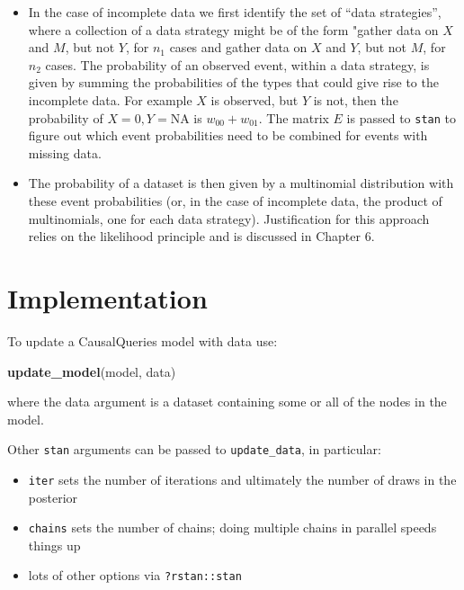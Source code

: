 \documentclass[
  12pt,
]{book}
\newenvironment{Shaded}{\begin{snugshade}}{\end{snugshade}}
\newcommand{\KeywordTok}[1]{\textcolor[rgb]{0.13,0.29,0.53}{\textbf{#1}}}
\newcommand{\NormalTok}[1]{#1}
\providecommand{\tightlist}{%
  \setlength{\itemsep}{0pt}\setlength{\parskip}{0pt}}
\begin{document}
\begin{itemize}
\item
  In the case of incomplete data we first identify the set of ``data strategies'', where a collection of a data strategy might be of the form "gather data on \(X\) and \(M\), but not \(Y\), for \(n_1\) cases and gather data on \(X\) and \(Y\), but not \(M\), for \(n_2\) cases. The probability of an observed event, within a data strategy, is given by summing the probabilities of the types that could give rise to the incomplete data. For example \(X\) is observed, but \(Y\) is not, then the probability of \(X=0, Y = \text{NA}\) is \(w_{00} +w_{01}\). The matrix \(E\) is passed to \texttt{stan} to figure out which event probabilities need to be combined for events with missing data.
\item
  The probability of a dataset is then given by a multinomial distribution with these event probabilities (or, in the case of incomplete data, the product of multinomials, one for each data strategy). Justification for this approach relies on the likelihood principle and is discussed in Chapter 6.
\end{itemize}

\hypertarget{implementation}{%
\section{Implementation}\label{implementation}}

To update a CausalQueries model with data use:

\begin{Shaded}
\begin{Highlighting}[]
\KeywordTok{update_model}\NormalTok{(model, data)}
\end{Highlighting}
\end{Shaded}

where the data argument is a dataset containing some or all of the nodes in the model.

Other \texttt{stan} arguments can be passed to \texttt{update\_data}, in particular:

\begin{itemize}
\tightlist
\item
  \texttt{iter} sets the number of iterations and ultimately the number of draws in the posterior
\item
  \texttt{chains} sets the number of chains; doing multiple chains in parallel speeds things up
\item
  lots of other options via \texttt{?rstan::stan}
\end{itemize}
\end{document}
